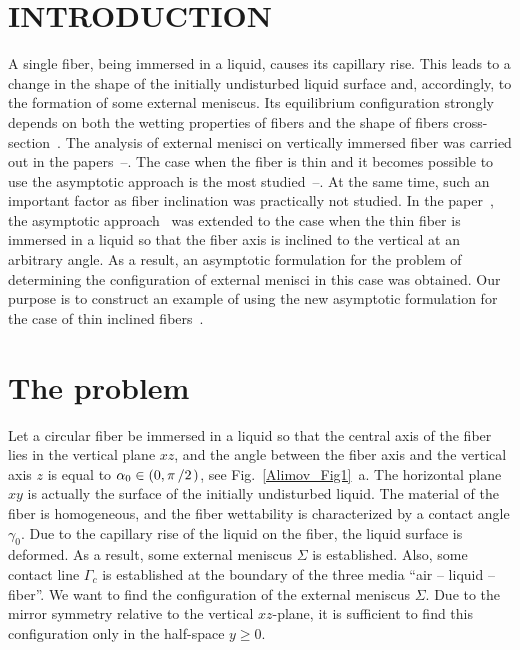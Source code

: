 \documentclass[
11pt,%
tightenlines,%
twoside,%
onecolumn,%
nofloats,%
nobibnotes,%
nofootinbib,%
superscriptaddress,%
noshowpacs,%
centertags]%
{revtex4-2}
\begin{document}
\section*{INTRODUCTION}
A single fiber, being immersed in a liquid, causes its capillary rise. This leads to a change in
the shape of the initially undisturbed liquid surface and, accordingly, to the formation of some
external meniscus. Its equilibrium configuration strongly depends on both the wetting properties of
fibers and the shape of fibers cross-section~\cite{Alimov:bib1}. The analysis of external menisci
on vertically immersed fiber was carried out in the papers~\cite{Alimov:bib2}--\cite{Alimov:bib4}.
The case when the fiber is thin and it becomes possible to use the asymptotic approach is the most
studied~\cite{Alimov:bib5}--\cite{Alimov:bib8}. At the same time, such an important factor as fiber
inclination was practically not studied. In the paper~\cite{Alimov:bib9}, the asymptotic
approach~\cite{Alimov:bib5} was extended to the case when the thin fiber is immersed in a liquid so
that the fiber axis is inclined to the vertical at an arbitrary angle. As a result, an asymptotic
formulation for the problem of determining the configuration of external menisci in this case was
obtained. Our purpose is to construct an example of using the new asymptotic formulation for the
case of thin inclined fibers~\cite{Alimov:bib9}.

\section{The problem} \label{Alimov:sec1}
Let a circular fiber be immersed in a liquid so that the central axis of the fiber lies in the
vertical plane $xz$, and the angle between the fiber axis and the vertical axis $z$ is equal to
$\alpha_0 \in \left( 0,\pi \left/ 2 \right. \right)$, see Fig.~\ref{Alimov_Fig1}~a. The horizontal
plane $xy$ is actually the surface of the initially undisturbed liquid. The material of the fiber
is homogeneous, and the fiber wettability is characterized by a contact angle $\gamma_0$. Due to
the capillary rise of the liquid on the fiber, the liquid surface is deformed. As a result, some
external meniscus $\Sigma$ is established. Also, some contact line $\Gamma_c $ is established at
the boundary of the three media ``air -- liquid -- fiber''. We want to find the configuration of
the external meniscus $\Sigma$. Due to the mirror symmetry relative to the vertical $xz$-plane, it
is sufficient to find this configuration only in the half-space $y \ge 0$.
\end{document}
